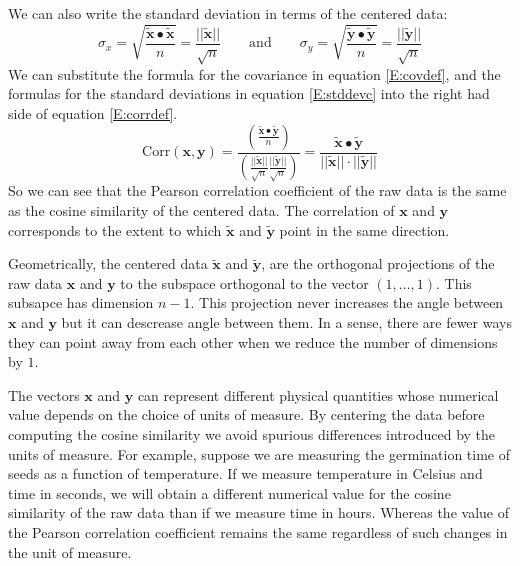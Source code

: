    We can also write the standard deviation in terms of the centered data:
\begin{equation}\label{E:stddevc}
  \sigma_x = \sqrt{ \frac{\widetilde{\mathbf{x}} \bullet \widetilde{\mathbf{x}}}{n}}
= \frac{||\widetilde{\mathbf{x}}||}{\sqrt{n}}
\qquad \mbox{and} \qquad 
  \sigma_y = \sqrt{ \frac{\widetilde{\mathbf{y}} \bullet \widetilde{\mathbf{y}}}{n}}
= \frac{||\widetilde{\mathbf{y}}||}{\sqrt{n}}
\end{equation}
We can substitute the formula for the covariance in equation \eqref{E:covdef},
and the formulas for the standard deviations in equation \eqref{E:stddevc}
into the right had side of equation \eqref{E:corrdef}.
\begin{equation}
\mathrm{Corr}(\mathbf{x}, \mathbf{y}) = 
\frac{\left(\displaystyle{\frac{\widetilde{\mathbf{x}} \bullet 
                                            \widetilde{\mathbf{y}}}{n}}\right)}
     {\left(\displaystyle{\frac{||\widetilde{\mathbf{x}}||}{\sqrt{n}}
               \frac{||\widetilde{\mathbf{y}}||}{\sqrt{n}} }\right)}
= \frac{\widetilde{\mathbf{x}} \bullet \widetilde{\mathbf{y}}}
       {||\widetilde{\mathbf{x}}|| \cdot ||\widetilde{\mathbf{y}}||} 
\end{equation}
So we can see that the Pearson correlation coefficient of the raw data is the
same as the cosine similarity of the centered data.  The correlation of 
$\mathbf{x}$ and $\mathbf{y}$ corresponds to the extent to which 
$\widetilde{\mathbf{x}}$ and $\widetilde{\mathbf{y}}$ point in the same 
direction.

    Geometrically, the centered data $\widetilde{\mathbf{x}}$ and 
$\widetilde{\mathbf{y}}$, are the orthogonal projections of the raw data 
$\mathbf{x}$ and $\mathbf{y}$ to the subspace orthogonal to the vector 
$(1, \dots, 1)$.  This subsapce has dimension $n - 1$.  This projection 
never increases the angle between $\mathbf{x}$ and $\mathbf{y}$ but it can 
descrease angle between them.  In a sense, there are fewer ways they can point 
away from each other when we reduce the number of dimensions by $1$. 

   The vectors $\mathbf{x}$ and $\mathbf{y}$ can represent different physical 
quantities whose numerical value depends on the choice of units of measure.
By centering the data before computing the cosine similarity we avoid spurious 
differences introduced by the units of measure.  For example, suppose we are 
measuring the germination time of seeds as a function of temperature.  If we 
measure temperature in Celsius and time in seconds, we will obtain a different 
numerical value for the cosine similarity of the raw data than if we measure 
time in hours.  Whereas the value of the Pearson correlation coefficient 
remains the same regardless of such changes in the unit of measure. 


